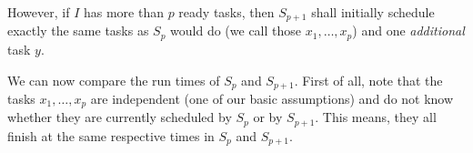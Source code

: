   However, if $I$ has more than $p$ ready tasks, then $S_{p+1}$ shall initially schedule exactly the same tasks as $S_p$ would do (we call those $x_1,\dots,x_p$) and one \emph{additional} task $y$.

  We can now compare the run times of $S_p$ and $S_{p+1}$. First of all, note that the tasks $x_1,\dots,x_p$ are independent (one of our basic assumptions) and do not know whether they are currently scheduled by $S_p$ or by $S_{p+1}$. This means, they all finish at the same respective times in $S_p$ and $S_{p+1}$. 




